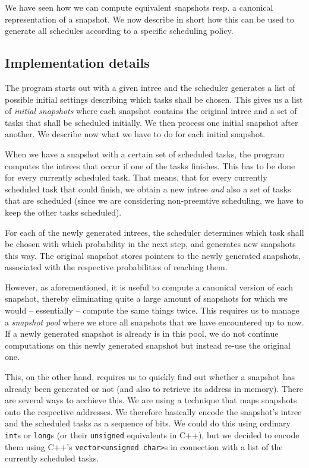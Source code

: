 We have seen how we can compute equivalent snapshots resp. a canonical representation of a snapshot. We now describe in short how this can be used to generate all schedules according to a specific scheduling policy.

\subsection{Implementation details}
\label{sec:implementation-computein-all-schedules-details}

The program starts out with a given intree and the scheduler generates a list of possible initial settings describing which tasks shall be chosen. This gives us a list of \emph{initial snapshots} where each snapshot contains the original intree and a set of tasks that shall be scheduled initially. We then process one initial snapshot after another. We describe now what we have to do for each initial snapshot.

When we have a snapshot with a certain set of scheduled tasks, the program computes the intrees that occur if one of the tasks finishes. This has to be done for every currently scheduled task. That means, that for every currently scheduled task that could finish, we obtain a new intree \emph{and} also a set of tasks that are scheduled (since we are considering non-preemtive scheduling, we have to keep the other tasks scheduled).

For each of the newly generated intrees, the scheduler determines which task shall be chosen with which probability in the next step, and generates new snapshots this way. The original snapshot stores pointers to the newly generated snapshots, associated with the respective probabilities of reaching them.

However, as aforementioned, it is useful to compute a canonical version of each snapshot, thereby eliminating quite a large amount of snapshots for which we would -- essentially -- compute the same things twice. This requires us to manage a \emph{snapshot pool} where we store all snapshots that we have encountered up to now. If a newly generated snapshot is already is in this pool, we do not continue computations on this newly generated snapshot but instead re-use the original one.

This, on the other hand, requires us to quickly find out whether a snapshot has already been generated or not (and also to retrieve its address in memory). There are several ways to acchieve this. We are using a technique that maps snapshots onto the respective addresses. We therefore basically encode the snapshot's intree and the scheduled tasks as a sequence of bits. We could do this using ordinary \texttt{int}s or \texttt{long}s (or their \texttt{unsigned} equivalents in C++), but we decided to encode them using C++'s \texttt{vector<unsigned char>}s in connection with a list of the currently scheduled tasks.

